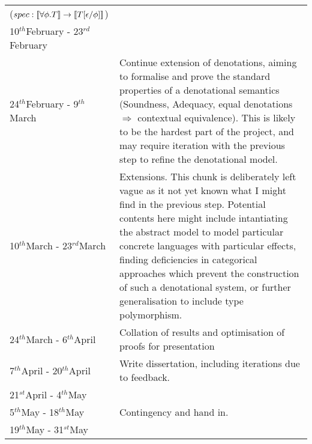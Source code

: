 \documentclass[11pt]{article}
\newcommand{\deno}[1]{{\bf [\![}#1{\bf ]\!]}}
\newcommand{\st}{$^{st}$}
\renewcommand{\th}{$^{th}$}
\newcommand{\rd}{$^{rd}$}
\begin{document}
\begin{tabular}{|p{6cm}||p{10cm}|}
	($spec: \deno{\forall \phi. T} \rightarrow \deno{T[ \epsilon / \phi ]} $)
	\\\cline{1-1}
	10\th February - 23\rd February &  \\\hline
	24\th February - 9\th March & Continue extension of denotations, aiming to formalise and prove the standard properties of a denotational semantics (Soundness, Adequacy, equal denotations $\Rightarrow$ contextual equivalence). This is likely to be the hardest part of the project, and may require iteration with the previous step to refine the denotational model. \\\hline
	10\th March - 23\rd March & Extensions. This chunk is deliberately left vague as it not yet known what I might find in the previous step. Potential contents here might include intantiating the abstract model to model particular concrete languages with particular effects, finding deficiencies in categorical approaches which prevent the construction of such a denotational system, or further generalisation to include type polymorphism. \\\hline
	24\th March - 6\th April & Collation of results and optimisation of proofs for presentation \\\hline
	7\th April - 20\th April & Write dissertation, including iterations due to feedback. \\\cline{1-1}
	21\st April - 4\th May &\\\hline
	5\th May - 18\th May & Contingency and hand in.\\\cline{1-1}
	19\th May - 31\st May & \\
\hline
\end{tabular}

\newpage
\appendix
\end{document}
